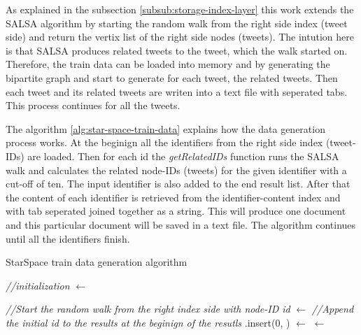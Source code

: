 As explained in the subsection \ref{subsub:storage-index-layer} this work extends the SALSA algorithm by starting the random walk from the right side index (tweet side) and return the vertix list of the right side nodes (tweets). The intution here is that SALSA produces related tweets to the tweet, which the walk started on. Therefore, the train data can be loaded into memory and by generating the bipartite graph and start to generate for each tweet, the related tweets. Then each tweet and its related tweets are writen into a text file with seperated tabs. This process continues for all the tweets.


The algorithm \ref{alg:star-space-train-data} explains how the data generation process works. At the beginign all the identifiers from the right side index (tweet-IDs) are loaded. Then for each id the \emph{getRelatedIDs} function runs the SALSA walk and calculates the related node-IDs (tweets) for the given identifier with a cut-off of ten. The input identifier is also added to the end result list. After that the content of each identifier is retrieved from the identifier-content index and with tab seperated joined together as a string. This will produce one document and this particular document will be saved in a text file. The algorithm continues until all the identifiers finish.


\begin{algorithm}[H]
    \caption{StarSpace train data generation algorithm}
    \label{alg:star-space-train-data}




    \SetAlgoLined

    \BlankLine\emph{//initialization}\BlankLine
    \allIDs $\leftarrow$ \getAllRightIndexKeys{}\;

    \BlankLine

    {
		\emph{//Start the random walk from the right index side with node-ID id}\;
		\listRecommendations $\leftarrow$ \getRelatedIDs{\id}\;
		\BlankLine
		\emph{//Append the initial id to the results at the beginign of the resutls}\;
		\listRecommendations.insert(0, \id)\;
		\BlankLine
		\listContent $\leftarrow$ \getContentOf{\listRecommendations}\;
		\document $\leftarrow$ \;
		\;
    }

    \BlankLine
\end{algorithm}


